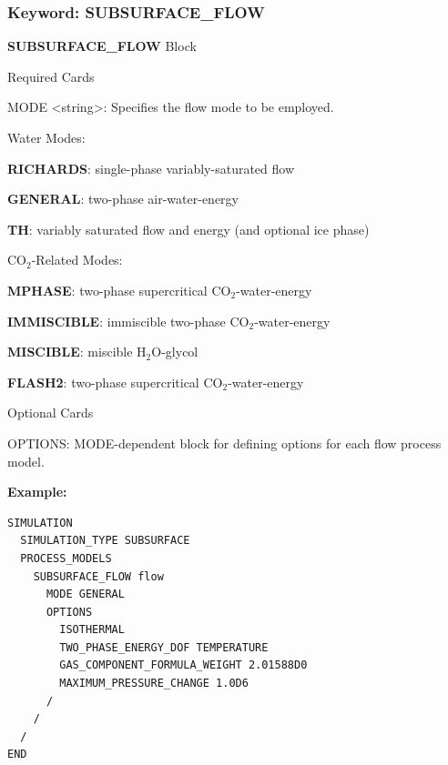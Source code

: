 \subsubsection{Keyword: SUBSURFACE\_FLOW}
\begin{description}
\item {\bf SUBSURFACE\_FLOW} Block

\begin{description}
\item Required Cards
\item MODE <string>: Specifies the flow mode to be employed. 
\end{description}

\item Water Modes:

\begin{description}
\item {\bf RICHARDS}: single-phase variably-saturated flow
\item {\bf GENERAL}: two-phase air-water-energy
\item {\bf TH}: variably saturated flow and energy (and optional ice phase)
\end{description}

\item CO$_2$-Related Modes:

\begin{description}
\item {\bf MPHASE}: two-phase supercritical CO$_2$-water-energy
\item {\bf IMMISCIBLE}: immiscible two-phase CO$_2$-water-energy
\item {\bf MISCIBLE}: miscible H$_2$O-glycol
\item {\bf FLASH2}: two-phase supercritical CO$_2$-water-energy
\end{description}

\item Optional Cards
\item OPTIONS: MODE-dependent block for defining options for each flow process model.

\end{description}

\small
\begin{mdframed}
{\bf Example:}
\footnotesize
\begin{verbatim}
SIMULATION
  SIMULATION_TYPE SUBSURFACE
  PROCESS_MODELS
    SUBSURFACE_FLOW flow
      MODE GENERAL
      OPTIONS
        ISOTHERMAL
        TWO_PHASE_ENERGY_DOF TEMPERATURE
        GAS_COMPONENT_FORMULA_WEIGHT 2.01588D0
        MAXIMUM_PRESSURE_CHANGE 1.0D6
      /
    /
  /
END
\end{verbatim}
\normalsize
\end{mdframed}
\normalsize

